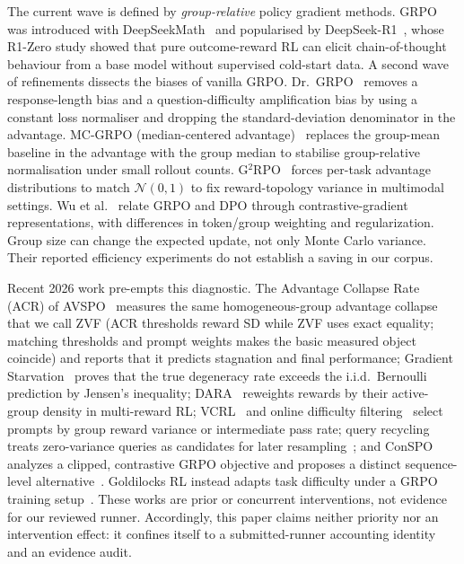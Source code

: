 The current wave is defined by \emph{group-relative} policy gradient methods.
GRPO was introduced with DeepSeekMath~\cite{shao2024deepseekmath} and
popularised by DeepSeek-R1~\cite{guo2025deepseekr1, guo2025deepseekr1nature}, whose R1-Zero study showed that
pure outcome-reward RL can elicit chain-of-thought behaviour from a base
model without supervised cold-start data. A second wave of refinements
dissects the biases of vanilla GRPO. Dr.~GRPO~\cite{tong2025drgrpo} removes a
response-length bias and a question-difficulty amplification bias by using a
constant loss normaliser and dropping the standard-deviation denominator in the
advantage. MC-GRPO (median-centered advantage)~\cite{mcgrpo2025} replaces the
group-mean baseline in the advantage with the group median to stabilise
group-relative normalisation under small rollout counts. G$^{2}$RPO~\cite{hu2026openvlthinker} forces per-task
advantage distributions to match $\mathcal{N}(0,1)$ to fix reward-topology variance in
multimodal settings. Wu et al.~\cite{wu2025grpodpo} relate GRPO and DPO through contrastive-gradient
representations, with differences in token/group weighting and regularization.
Group size can change the expected update, not only Monte Carlo variance.
Their reported efficiency experiments do not establish a saving in our corpus.

Recent 2026 work pre-empts this diagnostic. The Advantage Collapse Rate
(ACR) of AVSPO~\cite{he2026advantage} measures the same homogeneous-group
advantage collapse that we call ZVF (ACR thresholds reward SD while ZVF uses exact equality; matching thresholds
and prompt weights makes the basic measured object coincide) and reports that it predicts stagnation and final
performance; Gradient Starvation~\cite{nie2026gradstarvation} proves that the true
degeneracy rate exceeds the i.i.d.\ Bernoulli prediction by Jensen's
inequality; DARA~\cite{zheng2026dara} reweights rewards by their active-group
density in multi-reward RL; VCRL~\cite{jiang2025vcrl} and online difficulty
filtering~\cite{bae2025online} select prompts by group reward variance or
intermediate pass rate; query recycling treats zero-variance queries
as candidates for later resampling~\cite{coelho2026recycling}; and ConSPO
analyzes a clipped, contrastive GRPO objective and proposes a distinct
sequence-level alternative~\cite{zhang2026conspo}. Goldilocks RL instead
adapts task difficulty under a GRPO training setup~\cite{mahrooghi2026goldilocks}.
These works are prior or concurrent interventions, not evidence for our reviewed
runner. Accordingly, this paper claims neither priority nor an intervention
effect: it confines itself to a submitted-runner accounting identity and an
evidence audit.

